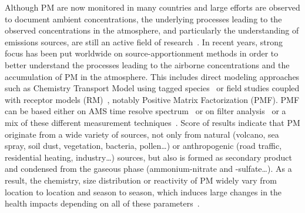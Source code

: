 \documentclass[acp]{copernicus}
\begin{document}
Although PM are now monitored in many countries and large efforts are
observed to document ambient concentrations, the underlying processes
leading to the observed concentrations in the atmosphere, and
particularly the understanding of emissions sources, are still an active
field of
research~\citep{diemozTransport2019,elhaddadPrimary2011,gollyOrganic2019,hodshirePotential2019,jaffrezoSeasonal2005,jiangSources2019,marconiSaharan2014,morenoVariations2010,piotQuantification2012,salamehPM22015,samakePolyols2019,wakedSource2014}.
In recent years, strong focus has been put worldwide on
source-apportionment methods in order to better understand the processes
leading to the airborne concentrations and the accumulation of PM in the
atmosphere. This includes direct modeling approaches such as Chemistry
Transport Model using tagged
species~\citep{brandtContribution2013,kranenburgSource2013,mirceaEuropean2020,wagstromDevelopment2008,wangDevelopment2009}
or field studies coupled with receptor models
(RM)~\citep{belisEvaluation2020,pernigottiSPECIEUROPE2016,simonDevelopment2010}, notably Positive
Matrix Factorization (PMF). PMF can be based either on AMS time resolve
spectrum~\citep{bozzettiArgon2017,petitSubmicron2014,petitTwo2015} or on filter
analysis~\citep{amatoAIRUSELIFE2016,bressiSources2014,fangPM22015,jainSource2018,jainSeasonal2020,liuSource2016,petitSources2019,salamehSources2018,srivastavaSpeciation2018a,wakedSource2014}
or a mix of these different measurement
techniques~\citep{costabileFirst2017,vlachouAdvanced2018,vlachouDevelopment2019}.
Score of results indicate that PM originate from a
wide variety of sources, not only from natural (volcano, sea spray, soil
dust, vegetation, bacteria, pollen\ldots) or anthropogenic (road
traffic, residential heating, industry\ldots) sources, but also is
formed as secondary product and condensed from the gaseous phase
(ammonium-nitrate and -sulfate\ldots). As a result, the chemistry, size
distribution or reactivity of PM widely vary from location to location
and season to season, which induces large changes in the health impacts
depending on all of these parameters~\citep{kellySize2012}.
\end{document}
